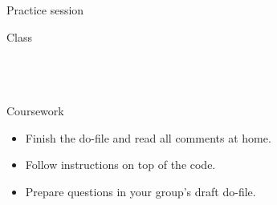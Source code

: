\documentclass[t]{beamer}
\begin{document}
	\begin{frame}[t]{Practice session}

    \begin{block}{Class}
      \\
      \\
      
			\\
			\\    
    \end{block}

    \begin{alertblock}{Coursework}
      \begin{itemize}
	       \item Finish the do-file and read all comments at home.
	       \item Follow instructions on top of the code.
	       \item Prepare questions in your group's draft do-file.
      \end{itemize}
    \end{alertblock}
    		
	\end{frame}
	
\end{document}
